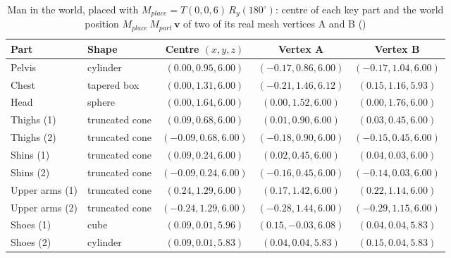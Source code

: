 \begin{table}[H]\centering\footnotesize
\caption{Man in the world, placed with $M_{place}=T(0, 0, 6)\,R_y(180^\circ)$: centre of each key part and the world position $M_{place}\,M_{part}\,\mathbf{v}$ of two of its real mesh vertices A and B ()}\label{tab:world_human_walk}
\begin{tabular}{@{}l l c c c@{}}
\toprule
Part & Shape & Centre $(x,y,z)$ & Vertex A & Vertex B \\
\midrule
Pelvis & cylinder & $(0.00, 0.95, 6.00)$ & $(-0.17, 0.86, 6.00)$ & $(-0.17, 1.04, 6.00)$ \\
Chest & tapered box & $(0.00, 1.31, 6.00)$ & $(-0.21, 1.46, 6.12)$ & $(0.15, 1.16, 5.93)$ \\
Head & sphere & $(0.00, 1.64, 6.00)$ & $(0.00, 1.52, 6.00)$ & $(0.00, 1.76, 6.00)$ \\
Thighs (1) & truncated cone & $(0.09, 0.68, 6.00)$ & $(0.01, 0.90, 6.00)$ & $(0.03, 0.45, 6.00)$ \\
Thighs (2) & truncated cone & $(-0.09, 0.68, 6.00)$ & $(-0.18, 0.90, 6.00)$ & $(-0.15, 0.45, 6.00)$ \\
Shins (1) & truncated cone & $(0.09, 0.24, 6.00)$ & $(0.02, 0.45, 6.00)$ & $(0.04, 0.03, 6.00)$ \\
Shins (2) & truncated cone & $(-0.09, 0.24, 6.00)$ & $(-0.16, 0.45, 6.00)$ & $(-0.14, 0.03, 6.00)$ \\
Upper arms (1) & truncated cone & $(0.24, 1.29, 6.00)$ & $(0.17, 1.42, 6.00)$ & $(0.22, 1.14, 6.00)$ \\
Upper arms (2) & truncated cone & $(-0.24, 1.29, 6.00)$ & $(-0.28, 1.44, 6.00)$ & $(-0.29, 1.15, 6.00)$ \\
Shoes (1) & cube & $(0.09, 0.01, 5.96)$ & $(0.15, -0.03, 6.08)$ & $(0.04, 0.04, 5.83)$ \\
Shoes (2) & cylinder & $(0.09, 0.01, 5.83)$ & $(0.04, 0.04, 5.83)$ & $(0.15, 0.04, 5.83)$ \\
\bottomrule
\end{tabular}
\end{table}
